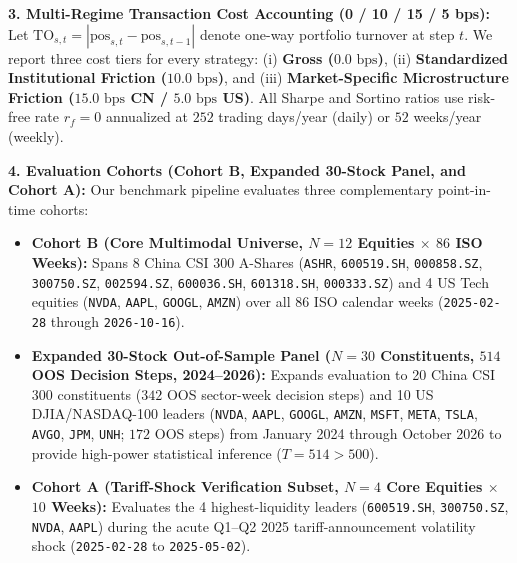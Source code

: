 \documentclass[10pt,a4paper,twocolumn]{article}
\begin{document}
\noindent\textbf{3. Multi-Regime Transaction Cost Accounting (0 / 10 / 15 / 5 bps):} Let $\text{TO}_{s,t} = |\text{pos}_{s,t} - \text{pos}_{s,t-1}|$ denote one-way portfolio turnover at step $t$. We report three cost tiers for every strategy: (i) \textbf{Gross ($0.0\text{ bps}$)}, (ii) \textbf{Standardized Institutional Friction ($10.0\text{ bps}$)}, and (iii) \textbf{Market-Specific Microstructure Friction ($15.0\text{ bps}$ CN / $5.0\text{ bps}$ US)}. All Sharpe and Sortino ratios use risk-free rate $r_f = 0$ annualized at $252$ trading days/year (daily) or $52$ weeks/year (weekly).

\noindent\textbf{4. Evaluation Cohorts (Cohort B, Expanded 30-Stock Panel, and Cohort A):} Our benchmark pipeline evaluates three complementary point-in-time cohorts:
\begin{itemize}
  \setlength{\itemsep}{0.5pt}\setlength{\parskip}{0pt}
  \item \textbf{Cohort B (Core Multimodal Universe, $N=12$ Equities $\times$ $86$ ISO Weeks):} Spans 8 China CSI 300 A-Shares (\texttt{ASHR}, \texttt{600519.SH}, \texttt{000858.SZ}, \texttt{300750.SZ}, \texttt{002594.SZ}, \texttt{600036.SH}, \texttt{601318.SH}, \texttt{000333.SZ}) and 4 US Tech equities (\texttt{NVDA}, \texttt{AAPL}, \texttt{GOOGL}, \texttt{AMZN}) over all 86 ISO calendar weeks (\texttt{2025-02-28} through \texttt{2026-10-16}).
  \item \textbf{Expanded 30-Stock Out-of-Sample Panel ($N=30$ Constituents, $514$ OOS Decision Steps, 2024--2026):} Expands evaluation to 20 China CSI 300 constituents ($342$ OOS sector-week decision steps) and 10 US DJIA/NASDAQ-100 leaders (\texttt{NVDA}, \texttt{AAPL}, \texttt{GOOGL}, \texttt{AMZN}, \texttt{MSFT}, \texttt{META}, \texttt{TSLA}, \texttt{AVGO}, \texttt{JPM}, \texttt{UNH}; $172$ OOS steps) from January 2024 through October 2026 to provide high-power statistical inference ($T = 514 > 500$).
  \item \textbf{Cohort A (Tariff-Shock Verification Subset, $N=4$ Core Equities $\times$ $10$ Weeks):} Evaluates the 4 highest-liquidity leaders (\texttt{600519.SH}, \texttt{300750.SZ}, \texttt{NVDA}, \texttt{AAPL}) during the acute Q1--Q2 2025 tariff-announcement volatility shock (\texttt{2025-02-28} to \texttt{2025-05-02}).
\end{itemize}
\end{document}
